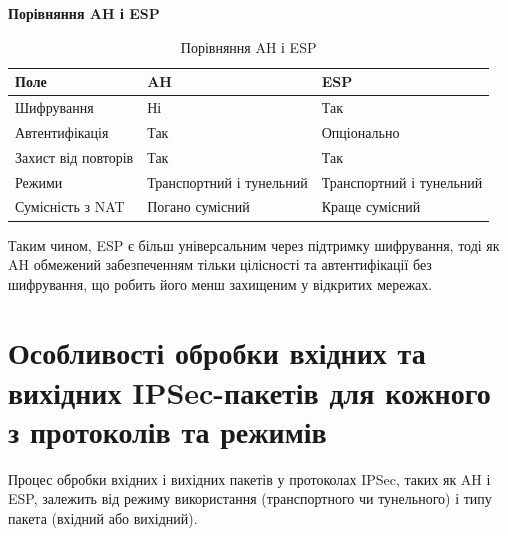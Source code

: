 \vspace{0.5cm}
\textbf{Порівняння AH і ESP}
\begin{table}[h!]
\centering
\begin{tabular}{|l|l|l|}
\hline
\rowcolor{gray!30} \textbf{Поле}             & \textbf{AH}                                      & \textbf{ESP}                                    \\ \hline
Шифрування          & \cellcolor{red!20}Ні                          & \cellcolor{green!20}Так                         \\ \hline
Автентифікація      & \cellcolor{green!20}Так                       & \cellcolor{gray!20}Опціонально                  \\ \hline
Захист від повторів & \cellcolor{green!20}Так                       & \cellcolor{green!20}Так                         \\ \hline
Режими              & \cellcolor{gray!20}Транспортний і тунельний   & \cellcolor{gray!20}Транспортний і тунельний     \\ \hline
Сумісність з NAT    & \cellcolor{red!20}Погано сумісний             & \cellcolor{green!20}Краще сумісний              \\ \hline
\end{tabular}
\caption{Порівняння AH і ESP}
\label{tab:comparison}
\end{table}

Таким чином, ESP є більш універсальним через підтримку шифрування, тоді як AH обмежений забезпеченням тільки цілісності та автентифікації без шифрування, що робить його менш захищеним у відкритих мережах.

\section{Особливості обробки вхідних та вихідних IPSec-пакетів для кожного з протоколів та режимів}

Процес обробки вхідних і вихідних пакетів у протоколах IPSec, таких як AH і ESP, залежить від режиму використання (транспортного чи тунельного) і типу пакета (вхідний або вихідний).

